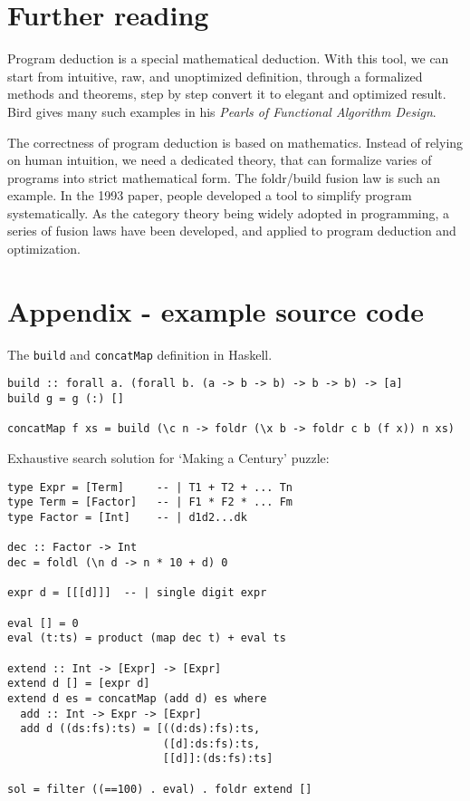 \documentclass{article}
\begin{document}
\section{Further reading}

Program deduction is a special mathematical deduction. With this tool, we can start from intuitive, raw, and unoptimized definition, through a formalized methods and theorems, step by step convert it to elegant and optimized result. Bird gives many such examples in his {\em Pearls of Functional Algorithm Design}\cite{Bird-2010}.

The correctness of program deduction is based on mathematics. Instead of relying on human intuition, we need a dedicated theory, that can formalize varies of programs into strict mathematical form. The foldr/build fusion law is such an example. In the 1993 paper\cite{GLPJ-1993}, people developed a tool to simplify program systematically. As the category theory being widely adopted in programming, a series of fusion laws have been developed\cite{Hinze-Harper-James-2010}, and applied to program deduction and optimization.

\section{Appendix - example source code}

The \texttt{build} and \texttt{concatMap} definition in Haskell.

\lstset{frame=single}
\begin{lstlisting}
build :: forall a. (forall b. (a -> b -> b) -> b -> b) -> [a]
build g = g (:) []

concatMap f xs = build (\c n -> foldr (\x b -> foldr c b (f x)) n xs)
\end{lstlisting}

Exhaustive search solution for `Making a Century' puzzle:

\begin{lstlisting}
type Expr = [Term]     -- | T1 + T2 + ... Tn
type Term = [Factor]   -- | F1 * F2 * ... Fm
type Factor = [Int]    -- | d1d2...dk

dec :: Factor -> Int
dec = foldl (\n d -> n * 10 + d) 0

expr d = [[[d]]]  -- | single digit expr

eval [] = 0
eval (t:ts) = product (map dec t) + eval ts

extend :: Int -> [Expr] -> [Expr]
extend d [] = [expr d]
extend d es = concatMap (add d) es where
  add :: Int -> Expr -> [Expr]
  add d ((ds:fs):ts) = [((d:ds):fs):ts,
                        ([d]:ds:fs):ts,
                        [[d]]:(ds:fs):ts]

sol = filter ((==100) . eval) . foldr extend []
\end{lstlisting}
\end{document}
